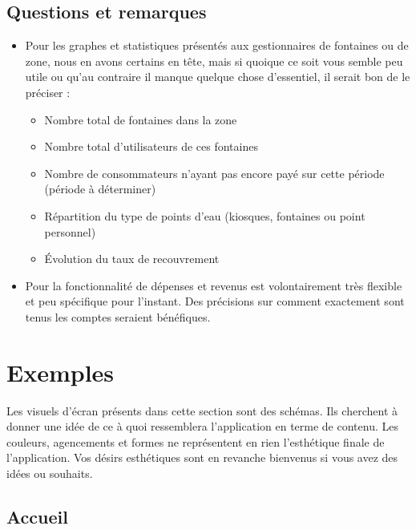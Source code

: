 \documentclass[a4paper, 11pt]{article}
\begin{document}
  \subsection{Questions et remarques}
  \begin{itemize}
    \item Pour les graphes et statistiques présentés aux gestionnaires de fontaines ou de zone, nous en avons certains en tête, mais si quoique ce soit vous semble peu utile ou qu'au contraire il manque quelque chose d'essentiel, il serait bon de le préciser :
    \begin{itemize}
      \item Nombre total de fontaines dans la zone
      \item Nombre total d'utilisateurs de ces fontaines
      \item Nombre de consommateurs n'ayant pas encore payé sur cette période (période à déterminer)
      \item Répartition du type de points d'eau (kiosques, fontaines ou point personnel)
      \item Évolution du taux de recouvrement
    \end{itemize}
    \item Pour la fonctionnalité de dépenses et revenus est volontairement très flexible et peu spécifique pour l'instant. Des précisions sur comment exactement sont tenus les comptes seraient bénéfiques.
  \end{itemize}
\section{Exemples}
  \begin{shaded}
    Les visuels d'écran présents dans cette section sont des schémas. Ils cherchent à donner une idée de ce à quoi ressemblera l'application en terme de contenu. Les couleurs, agencements et formes ne représentent en rien l'esthétique finale de l'application. Vos désirs esthétiques sont en revanche bienvenus si vous avez des idées ou souhaits.
  \end{shaded}

  \subsection{Accueil}
\end{document}
